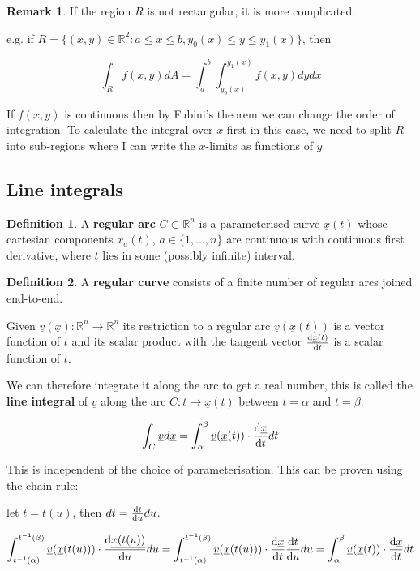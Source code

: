 \documentclass[12pt,a4paper]{article}
\theoremstyle{definition}
\newtheorem{definition}{Definition}[subsection]
\newtheorem*{remark}{Remark}
\begin{document}
\begin{remark}
	If the region $R$ is not rectangular, it is more complicated.
	
	e.g. if $R = \{(x, y) \in \mathbb{R}^2: a \le x \le b, y_0(x) \le y \le y_1(x)\}$, then
	
	\[\int_R f(x, y) dA = \int_a^b \int_{y_0(x)}^{y_1(x)} f(x, y) dy dx\]

	If $f(x, y)$ is continuous then by Fubini's theorem we can change the order of integration. To calculate the integral over $x$ first in this case, we need to split $R$ into sub-regions where I can write the $x$-limits as functions of $y$.
\end{remark}

\subsection{Line integrals}

\begin{definition}
	A \textbf{regular arc} $C \subset \mathbb{R}^n$ is a parameterised curve $\underline{x}(t)$ whose cartesian components $x_a(t)$, $a \in \{1, \dots, n\}$ are continuous with continuous first derivative, where $t$ lies in some (possibly infinite) interval.	
\end{definition}

\begin{definition}
	A \textbf{regular curve} consists of a finite number of regular arcs joined end-to-end.
\end{definition}

Given $\underline{v}(\underline{x}): \mathbb{R}^n \rightarrow \mathbb{R}^n$ its restriction to a regular arc $\underline{v}(\underline{x}(t))$ is a vector function of $t$ and its scalar product with the tangent vector $\diff{\underline{x}(t)}{t}$ is a scalar function of $t$.

We can therefore integrate it along the arc to get a real number, this is called the \textbf{line integral} of $\underline{v}$ along the arc $C: t \rightarrow \underline{x}(t)$ between $t = \alpha$ and $t = \beta$.

\[\int_C \underline{v} d\underline{x} = \int_{\alpha}^{\beta} \underline{v}(\underline{x}(t)) \cdot \diff{\underline{x}}{t} dt\]

This is independent of the choice of parameterisation. This can be proven using the chain rule:

let $t = t(u)$, then $dt = \diff{t}{u} du$.

\[\int_{t^{-1}(\alpha)}^{t^{-1}(\beta)} \underline{v}(\underline{x}(t(u))) \cdot \diff{\underline{x(t(u))}}{u} du = \int_{t^{-1}(\alpha)}^{t^{-1}(\beta)} \underline{v}(\underline{x}(t(u))) \cdot \diff{\underline{x}}{t} \diff{t}{u} du = \int_{\alpha}^{\beta} \underline{v}(\underline{x}(t)) \cdot \diff{\underline{x}}{t} dt\]
\end{document}
